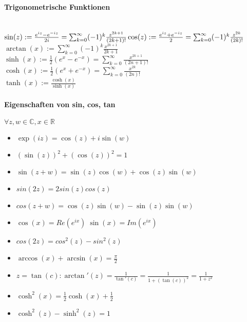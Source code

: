 \documentclass[paper=a3,paper=landscape, fontsize=9pt, DIV=30]{scrartcl}
\newcommand{\real}{{\mathbb{R}}}
\newcommand{\compl}{\mathbb{C}}
\begin{document}
\begin{multicols*}{4}
  \paragraph{Trigonometrische Funktionen}\hspace{0pt} \\
  $\sin(z):=\frac{e^{iz}-e^{-iz}}{2i} = \sum_{k=0}^{\infty} (-1)^k \frac{z^{2k+1}}{(2k+1)!}\\
  \cos(z):=\frac{e^{iz}+e^{-iz}}{2} = \sum_{k=0}^{\infty} (-1)^k\frac{z^{2k}}{(2k)!}$\\
  $\arctan(x):=\sum_{k=0}^{\infty}(-1)^k \frac{x^{2k+1}}{2k+1}$\\
  $\sinh(x):=\frac{1}{2}(e^x-e^{-x})=\sum_{k=0}^{\infty}\frac{x^{2k+1}}{(2n+1)!}$\\
  $\cosh(x):=\frac{1}{2}(e^x+e^{-x})=\sum_{k=0}^{\infty}\frac{x^{2k}}{(2n)!}$\\
  $\tanh(x):=\frac{\cosh(x)}{\sinh(x)}$

  \paragraph{Eigenschaften von sin, cos, tan}
  $\forall z,w \in \compl, x \in \real$

  \begin{itemize}
  \item $\exp(iz) = \cos(z)+i\sin(w)$
  \item $(\sin(z))^2+(\cos(z))^2=1$
  \item $\sin(z+w)=\sin(z)\cos(w)+\cos(z)\sin(w)$
  \item $sin(2z)=2sin(z)cos(z)$
  \item $cos(z+w)=\cos(z)\sin(w)-\sin(z)\sin(w)$
  \item $\cos(x)=Re(e^{ix}) \; \sin(x)=Im(e^{ix})$
  \item $cos(2z)=cos^2(z)-sin^2(z)$
  \item $\arccos(x)+\arcsin(x)=\frac{\pi}{2}$
  \item $z=\tan(c): \arctan'(z)=\frac{1}{\tan'(c)}=\frac{1}{1+(\tan(c))^2}=\frac{1}{1+z^2}$
  \item $\cosh^2(x)=\frac{1}{2}\cosh(x)+\frac{1}{2}$
  \item $\cosh^2(z) - \sinh^2(z)=1$
  \end{itemize}



\end{multicols*}
\end{document}
